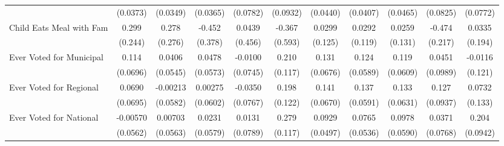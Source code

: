 {\begin{tabular}{l*{10}{c}}
            &    (0.0373)         &    (0.0349)         &    (0.0365)         &    (0.0782)         &    (0.0932)         &    (0.0440)         &    (0.0407)         &    (0.0465)         &    (0.0825)         &    (0.0772)         \\
\addlinespace
Child Eats Meal with Fam&       0.299         &       0.278         &      -0.452         &      0.0439         &      -0.367         &      0.0299         &      0.0292         &      0.0259         &      -0.474\sym{*}  &      0.0335         \\
            &     (0.244)         &     (0.276)         &     (0.378)         &     (0.456)         &     (0.593)         &     (0.125)         &     (0.119)         &     (0.131)         &     (0.217)         &     (0.194)         \\
\addlinespace
Ever Voted for Municipal&       0.114         &      0.0406         &      0.0478         &     -0.0100         &       0.210         &       0.131         &       0.124\sym{*}  &       0.119         &      0.0451         &     -0.0116         \\
            &    (0.0696)         &    (0.0545)         &    (0.0573)         &    (0.0745)         &     (0.117)         &    (0.0676)         &    (0.0589)         &    (0.0609)         &    (0.0989)         &     (0.121)         \\
\addlinespace
Ever Voted for Regional&      0.0690         &    -0.00213         &     0.00275         &     -0.0350         &       0.198         &       0.141\sym{*}  &       0.137\sym{*}  &       0.133\sym{*}  &       0.127         &      0.0732         \\
            &    (0.0695)         &    (0.0582)         &    (0.0602)         &    (0.0767)         &     (0.122)         &    (0.0670)         &    (0.0591)         &    (0.0631)         &    (0.0937)         &     (0.133)         \\
\addlinespace
Ever Voted for National&    -0.00570         &     0.00703         &      0.0231         &      0.0131         &       0.279\sym{*}  &      0.0929         &      0.0765         &      0.0978         &      0.0371         &       0.204\sym{*}  \\
            &    (0.0562)         &    (0.0563)         &    (0.0579)         &    (0.0789)         &     (0.117)         &    (0.0497)         &    (0.0536)         &    (0.0590)         &    (0.0768)         &    (0.0942)         \\
\bottomrule
\end{tabular}
}
